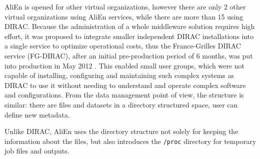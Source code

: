 AliEn is opened for other virtual organizations, however there are only 2 other virtual organizations using 
AliEn services, while there are more than 15 using DIRAC. Because the administration of a whole middleware 
solution requires high effort, it was proposed to integrate smaller independent DIRAC installations into 
a single service to optimize operational costs, thus the France-Grilles DIRAC service (FG-DIRAC), 
after an initial pre-production period of 6 months, was put into production in May 2012 \cite{FGDIRAC}.
This enabled small user groups, which were not capable of installing, configuring and maintaining  
such complex systems as DIRAC to use it without needing to understand and operate complex software and
configurations. From the data management point of view, the  structure is similar: there are files and datasets in a 
directory structured space, user can define new metadata.


Unlike DIRAC, AliEn uses the directory structure not solely for keeping the information about the files, 
but also introduces the \texttt{/proc} directory for temporary job files and outputs.